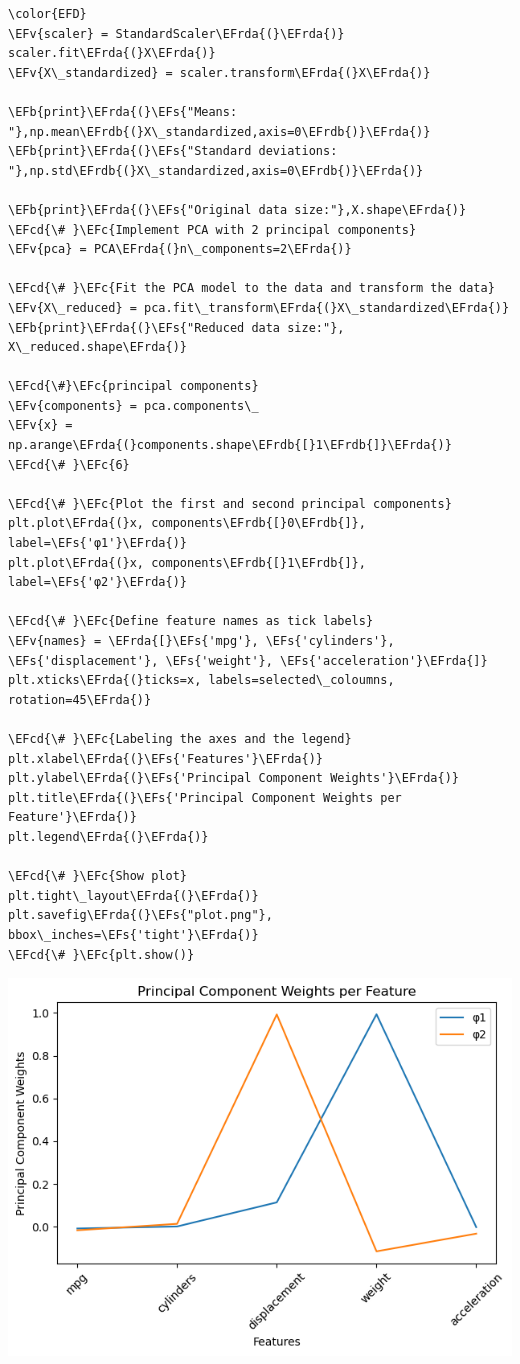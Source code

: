 \documentclass[11pt]{article}
\newcommand{\EFc}[1]{\textcolor{EFc}{#1}} %
\newcommand{\EFcd}[1]{\textcolor{EFcd}{#1}} %
\newcommand{\EFs}[1]{\textcolor{EFs}{#1}} %
\newcommand{\EFb}[1]{\textcolor{EFb}{#1}} %
\newcommand{\EFv}[1]{\textcolor{EFv}{#1}} %
\newcommand{\EFrda}[1]{\textcolor{EFrda}{#1}} %
\newcommand{\EFrdb}[1]{\textcolor{EFrdb}{#1}} %
\begin{document}
\begin{Code}
\begin{Verbatim}
\color{EFD}
\EFv{scaler} = StandardScaler\EFrda{(}\EFrda{)}
scaler.fit\EFrda{(}X\EFrda{)}
\EFv{X\_standardized} = scaler.transform\EFrda{(}X\EFrda{)}

\EFb{print}\EFrda{(}\EFs{"Means: "},np.mean\EFrdb{(}X\_standardized,axis=0\EFrdb{)}\EFrda{)}
\EFb{print}\EFrda{(}\EFs{"Standard deviations: "},np.std\EFrdb{(}X\_standardized,axis=0\EFrdb{)}\EFrda{)}

\EFb{print}\EFrda{(}\EFs{"Original data size:"},X.shape\EFrda{)}
\EFcd{\# }\EFc{Implement PCA with 2 principal components}
\EFv{pca} = PCA\EFrda{(}n\_components=2\EFrda{)}

\EFcd{\# }\EFc{Fit the PCA model to the data and transform the data}
\EFv{X\_reduced} = pca.fit\_transform\EFrda{(}X\_standardized\EFrda{)}
\EFb{print}\EFrda{(}\EFs{"Reduced data size:"}, X\_reduced.shape\EFrda{)}

\EFcd{\#}\EFc{principal components}
\EFv{components} = pca.components\_
\EFv{x} = np.arange\EFrda{(}components.shape\EFrdb{[}1\EFrdb{]}\EFrda{)} \EFcd{\# }\EFc{6}

\EFcd{\# }\EFc{Plot the first and second principal components}
plt.plot\EFrda{(}x, components\EFrdb{[}0\EFrdb{]}, label=\EFs{'φ1'}\EFrda{)}
plt.plot\EFrda{(}x, components\EFrdb{[}1\EFrdb{]}, label=\EFs{'φ2'}\EFrda{)}

\EFcd{\# }\EFc{Define feature names as tick labels}
\EFv{names} = \EFrda{[}\EFs{'mpg'}, \EFs{'cylinders'}, \EFs{'displacement'}, \EFs{'weight'}, \EFs{'acceleration'}\EFrda{]}
plt.xticks\EFrda{(}ticks=x, labels=selected\_coloumns, rotation=45\EFrda{)}

\EFcd{\# }\EFc{Labeling the axes and the legend}
plt.xlabel\EFrda{(}\EFs{'Features'}\EFrda{)}
plt.ylabel\EFrda{(}\EFs{'Principal Component Weights'}\EFrda{)}
plt.title\EFrda{(}\EFs{'Principal Component Weights per Feature'}\EFrda{)}
plt.legend\EFrda{(}\EFrda{)}

\EFcd{\# }\EFc{Show plot}
plt.tight\_layout\EFrda{(}\EFrda{)}
plt.savefig\EFrda{(}\EFs{"plot.png"}, bbox\_inches=\EFs{'tight'}\EFrda{)}
\EFcd{\# }\EFc{plt.show()}
\end{Verbatim}
\end{Code}

\begin{center}
\includegraphics[width=.9\linewidth]{plot.png}
\end{center}
\end{document}
